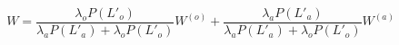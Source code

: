 \begin{equation}\label{overall_waiting_time}
    W = \frac{\lambda_o P(L'_o)}{\lambda_a P(L'_a) + \lambda_o P(L'_o)} W^{(o)} + 
    \frac{\lambda_a P(L'_a)}{\lambda_a P(L'_a) + \lambda_o P(L'_o)} W^{(a)}
\end{equation}






